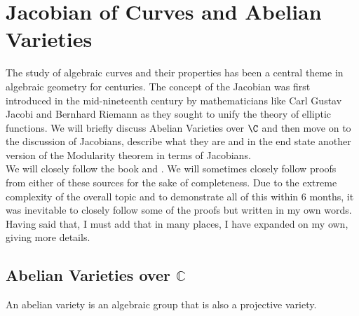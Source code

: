 \section{Jacobian of Curves and Abelian Varieties}


The study of algebraic curves and their properties has been a central theme in algebraic geometry for centuries. The concept of the Jacobian was first introduced in the mid-nineteenth century by mathematicians like Carl Gustav Jacobi and Bernhard Riemann as they sought to unify the theory of elliptic functions. We will briefly discuss Abelian Varieties over $\C$ and then move on to the discussion of Jacobians, describe what they are and in the end state another version of the Modularity theorem in terms of Jacobians. \\ We will closely follow the book \cite{diamond2005first} and \cite{hindry-silverman-diophantine}. We will sometimes closely follow proofs from either of these sources for the sake of completeness. Due to the extreme complexity of the overall topic and to demonstrate all of this within 6 months, it was inevitable to closely follow some of the proofs but written in my own words. Having said that, I must add that in many places, I have expanded on my own, giving more details.


\subsection{Abelian Varieties over $\mathbb{C}$}

\begin{definition}
  An abelian variety is an algebraic group that is also a projective variety.
  
\end{definition}

